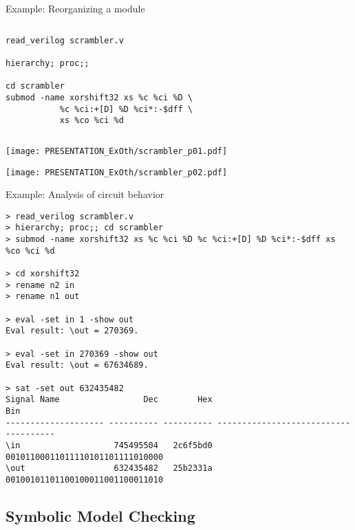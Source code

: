 \begin{frame}[t, fragile]{Example: Reorganizing a module}
\begin{columns}
\column[t]{4cm}

\column[t]{7cm}
\begin{lstlisting}[basicstyle=\ttfamily\fontsize{8pt}{10pt}\selectfont, language=ys, frame=single]
read_verilog scrambler.v

hierarchy; proc;;

cd scrambler
submod -name xorshift32 xs %c %ci %D \
           %c %ci:+[D] %D %ci*:-$dff \
           xs %co %ci %d
\end{lstlisting}
\end{columns}

\hfil\texttt{[image: PRESENTATION\_ExOth/scrambler\_p01.pdf]}

\hfil\texttt{[image: PRESENTATION\_ExOth/scrambler\_p02.pdf]}
\end{frame}

\begin{frame}[t, fragile]{Example: Analysis of circuit behavior}
\begin{lstlisting}[basicstyle=\ttfamily\fontsize{8pt}{10pt}\selectfont, language=ys]
> read_verilog scrambler.v
> hierarchy; proc;; cd scrambler
> submod -name xorshift32 xs %c %ci %D %c %ci:+[D] %D %ci*:-$dff xs %co %ci %d

> cd xorshift32
> rename n2 in
> rename n1 out

> eval -set in 1 -show out
Eval result: \out = 270369.

> eval -set in 270369 -show out
Eval result: \out = 67634689.

> sat -set out 632435482
Signal Name                 Dec        Hex                                   Bin
-------------------- ---------- ---------- -------------------------------------
\in                   745495504   2c6f5bd0      00101100011011110101101111010000
\out                  632435482   25b2331a      00100101101100100011001100011010
\end{lstlisting}
\end{frame}


\subsection{Symbolic Model Checking}

